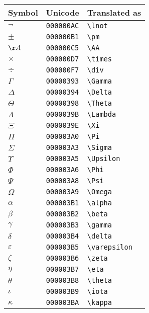 \begin{longtable}{|l|l|l|}
\hline
Symbol & Unicode & Translated as \\
\endhead
\hline
$\lnot$ & \texttt{000000AC} & \verb|\lnot| \\
\hline
$\pm$ & \texttt{000000B1} & \verb|\pm| \\
\hline
$\AA$ & \texttt{000000C5} & \verb|\AA| \\
\hline
$\times$ & \texttt{000000D7} & \verb|\times| \\
\hline
$\div$ & \texttt{000000F7} & \verb|\div| \\
\hline
$\Gamma$ & \texttt{00000393} & \verb|\Gamma| \\
\hline
$\Delta$ & \texttt{00000394} & \verb|\Delta| \\
\hline
$\Theta$ & \texttt{00000398} & \verb|\Theta| \\
\hline
$\Lambda$ & \texttt{0000039B} & \verb|\Lambda| \\
\hline
$\Xi$ & \texttt{0000039E} & \verb|\Xi| \\
\hline
$\Pi$ & \texttt{000003A0} & \verb|\Pi| \\
\hline
$\Sigma$ & \texttt{000003A3} & \verb|\Sigma| \\
\hline
$\Upsilon$ & \texttt{000003A5} & \verb|\Upsilon| \\
\hline
$\Phi$ & \texttt{000003A6} & \verb|\Phi| \\
\hline
$\Psi$ & \texttt{000003A8} & \verb|\Psi| \\
\hline
$\Omega$ & \texttt{000003A9} & \verb|\Omega| \\
\hline
$\alpha$ & \texttt{000003B1} & \verb|\alpha| \\
\hline
$\beta$ & \texttt{000003B2} & \verb|\beta| \\
\hline
$\gamma$ & \texttt{000003B3} & \verb|\gamma| \\
\hline
$\delta$ & \texttt{000003B4} & \verb|\delta| \\
\hline
$\varepsilon$ & \texttt{000003B5} & \verb|\varepsilon| \\
\hline
$\zeta$ & \texttt{000003B6} & \verb|\zeta| \\
\hline
$\eta$ & \texttt{000003B7} & \verb|\eta| \\
\hline
$\theta$ & \texttt{000003B8} & \verb|\theta| \\
\hline
$\iota$ & \texttt{000003B9} & \verb|\iota| \\
\hline
$\kappa$ & \texttt{000003BA} & \verb|\kappa| \\
\hline

\end{longtable}
